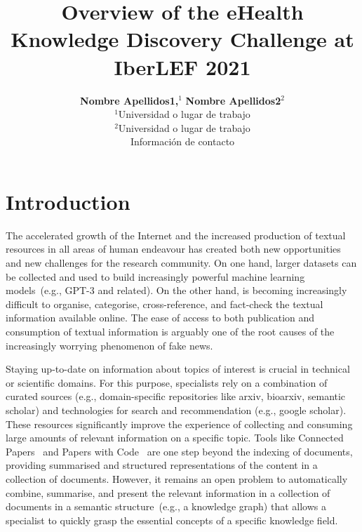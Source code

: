 \documentclass[a4paper,11pt,twocolumn,twoside]{article}
\title{Overview of the eHealth Knowledge Discovery Challenge at IberLEF 2021}
\author {\textbf{Nombre Apellidos1,$^1$} \textbf{Nombre Apellidos2$^2$}\\
$^1$Universidad o lugar de trabajo\\
$^2$Universidad o lugar de trabajo\\
Información de contacto\\
}
\begin{document}


\label{firstpage} \maketitle

%

\section{Introduction}


The accelerated growth of the Internet and the increased production of textual resources in all areas of human endeavour has created both new opportunities and new challenges for the research community.
On one hand, larger datasets can be collected and used to build increasingly powerful machine learning models~(e.g., GPT-3 and related).
On the other hand, is becoming increasingly difficult to organise, categorise, cross-reference, and fact-check the textual information available online.
The ease of access to both publication and consumption of textual information is arguably one of the root causes of the increasingly worrying phenomenon of fake news.

Staying up-to-date on information about topics of interest is crucial in technical or scientific domains.
For this purpose, specialists rely on a combination of curated sources (e.g., domain-specific repositories like arxiv, bioarxiv, semantic scholar) and technologies for search and recommendation (e.g., google scholar).
These resources significantly improve the experience of collecting and consuming large amounts of relevant information on a specific topic.
Tools like Connected Papers~\cite{} and Papers with Code~\cite{} are one step beyond the indexing of documents, providing summarised and structured representations of the content in a collection of documents.
However, it remains an open problem to automatically combine, summarise, and present the relevant information in a collection of documents in a semantic structure~(e.g., a knowledge graph) that allows a specialist to quickly grasp the essential concepts of a specific knowledge field.
\end{document}

